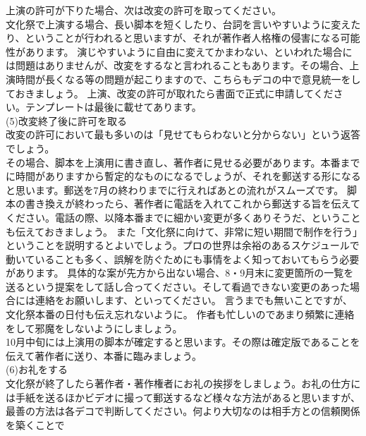 \documentclass[book, twoside, paper=b5j, fleqn, jafontsize=9pt, jafontscale=1, head_space=22mm, foot_space=9mm, fore-edge=16mm, gutter=25mm, hanging_punctuation]{jlreq}
\begin{document}
上演の許可が下りた場合、次は改変の許可を取ってください。\\
文化祭で上演する場合、長い脚本を短くしたり、台詞を言いやすいように変えたり、ということが行われると思いますが、それが著作者人格権の侵害になる可能性があります。
演じやすいように自由に変えてかまわない、といわれた場合には問題はありませんが、改変をするなと言われることもあります。その場合、上演時間が長くなる等の問題が起こりますので、こちらもデコの中で意見統一をしておきましょう。
上演、改変の許可が取れたら書面で正式に申請してください。テンプレートは最後に載せてあります。
\\
(5)改変終了後に許可を取る\\
改変の許可において最も多いのは「見せてもらわないと分からない」という返答でしょう。\\
その場合、脚本を上演用に書き直し、著作者に見せる必要があります。本番までに時間がありますから暫定的なものになるでしょうが、それを郵送する形になると思います。郵送を7月の終わりまでに行えればあとの流れがスムーズです。
脚本の書き換えが終わったら、著作者に電話を入れてこれから郵送する旨を伝えてください。電話の際、以降本番までに細かい変更が多くありそうだ、ということも伝えておきましょう。
また「文化祭に向けて、非常に短い期間で制作を行う」ということを説明するとよいでしょう。プロの世界は余裕のあるスケジュールで動いていることも多く、誤解を防ぐためにも事情をよく知っておいてもらう必要があります。
具体的な案が先方から出ない場合、8・9月末に\footnotemark[1] 変更箇所の一覧を送るという提案をして話し合ってください。そして看過できない変更のあった場合には連絡をお願いします、といってください。
言うまでも無いことですが、文化祭本番の日付も伝え忘れないように。
作者も忙しいのであまり頻繁に連絡をして邪魔をしないようにしましょう。\\
10月中旬には上演用の脚本が確定すると思います。その際は確定版であることを伝えて著作者に送り、本番に臨みましょう。
\\
(6)お礼をする\\
文化祭が終了したら著作者・著作権者にお礼の挨拶をしましょう。お礼の仕方には手紙を送るほかビデオに撮って郵送するなど様々な方法があると思いますが、最善の方法は各デコで判断してください。何より大切なのは相手方との信頼関係を築くことで
\end{document}
